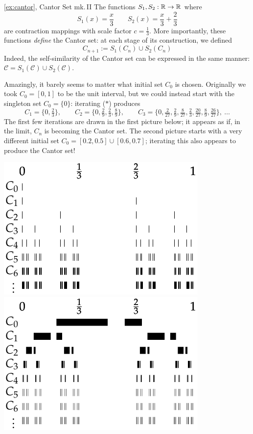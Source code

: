 \begin{example*}{\ref{ex:cantor}, Cantor Set mk.\,II}{}
	The functions $S_1,S_2:\mathbb{R}\to\mathbb{R}$ where
	\[
		S_1(x)=\frac x3\qquad S_2(x)=\frac x3+\frac 23
	\]
	are contraction mappings with scale factor $c=\frac 13$. More importantly, these functions \emph{define} the Cantor set: at each stage of its construction, we defined
	\[
		C_{n+1}:=S_1(C_n)\cup S_2(C_n) \tag{$\ast$}
	\]
	Indeed, the self-similarity of the Cantor set can be expressed in the same manner: $\mathcal C=S_1(\mathcal C)\cup S_2(\mathcal C)$.\smallbreak
	
	Amazingly, it barely seems to matter what initial set $C_0$ is chosen. Originally we took $C_0=[0,1]$ to be the unit interval, but we could instead start with the singleton set $C_0=\{0\}$: iterating ($\ast$) produces
	\[
		C_1=\bigl\{0,\tfrac 23\bigr\},\qquad 
		C_2=\bigl\{0,\tfrac 29,\tfrac 23,\tfrac 89\bigr\},\qquad 
		C_3=\bigl\{0,\tfrac 2{27},\tfrac 29,\tfrac 8{27},\tfrac 23,\tfrac{20}{27},\tfrac 89,\tfrac{26}{27}\bigr\},\ \ldots
	\]
	The first few iterations are drawn in the first picture below; it appears as if, in the limit, $C_n$ is becoming the Cantor set. The second picture starts with a very different initial set $C_0=[0.2,0.5]\cup[0.6,0.7]$; iterating this also appears to produce the Cantor set!
	\begin{center}
		\includegraphics{cantor-similar3}
		\qquad\qquad
		\includegraphics{cantor-similar2}
	\end{center}
\end{example*}



